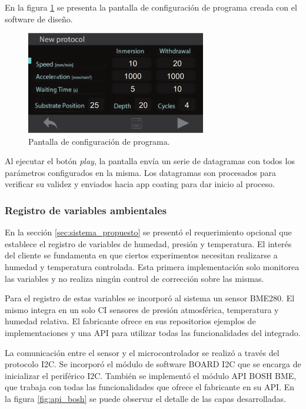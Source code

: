  
En la figura \ref{fig:stone_a} se presenta la pantalla de configuración de programa creada con el software de diseño. 

\begin{figure}[h!]
	\centering
	\includegraphics[width=0.7\textwidth]{./Figures/pantalla.png}
	\caption{Pantalla de configuración de programa.}
	\label{fig:stone_a}
\end{figure}  

Al ejecutar el botón \textit{play}, la pantalla envía un serie de datagramas con todos los parámetros configurados en la misma. Los datagramas son procesados para verificar su validez y enviados hacia app coating para dar inicio al proceso. 
 

\subsubsection{Registro de variables ambientales}

En la sección \ref{sec:sistema_propuesto} se presentó el requerimiento opcional que establece el registro de variables de humedad, presión y temperatura. El interés del cliente se fundamenta en que ciertos experimentos necesitan realizarse a humedad y temperatura controlada. Esta primera implementación solo monitorea las variables y no realiza ningún control de corrección sobre las mismas. 

Para el registro de estas variables se incorporó al sistema un sensor BME280. El mismo integra en un solo CI sensores de presión atmosférica, temperatura y humedad relativa. El fabricante ofrece en sus repositorios \citep{web_repositorio_api_bosh} ejemplos de implementaciones y una API para utilizar todas las funcionalidades del integrado.

La comunicación entre el sensor y el microcontrolador se realizó a través del protocolo I2C. Se incorporó el módulo de software BOARD I2C que se encarga de inicializar el periférico I2C. También se implementó el módulo API BOSH BME, que trabaja con todas las funcionalidades que ofrece el fabricante en su API. En la figura \ref{fig:api_bosh} se puede observar el detalle de las capas desarrolladas.

